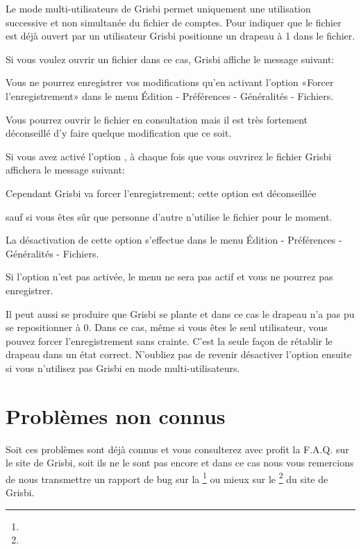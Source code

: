 Le mode multi-utilisateurs de Grisbi permet uniquement une utilisation
successive et non simultanée du fichier de comptes. Pour indiquer que le fichier
est déjà ouvert par un utilisateur Grisbi positionne un drapeau à 1 dans
le fichier.

Si vous voulez ouvrir un fichier dans ce cas, Grisbi affiche le message suivant: 

\begin{center}

Vous ne pourrez enregistrer vos modifications qu'en activant l'option «Forcer
l'enregistrement» dans le menu Édition - Préférences - Généralités - Fichiers.
\end{center}

Vous pourrez ouvrir le fichier en consultation mais il est très fortement
déconseillé d'y faire quelque modification que ce soit.

Si vous avez activé l'option , à chaque fois que
vous ouvrirez le fichier Grisbi affichera le message suivant: 

\begin{center}

Cependant Grisbi va forcer l'enregistrement; cette option est déconseillée

sauf si vous êtes sûr que personne d'autre n'utilise le fichier pour le
moment.

La désactivation de cette option s'effectue dans le menu Édition - Préférences - Généralités - Fichiers.
\end{center}

Si l'option n'est pas activée, le menu  ne sera pas
actif et vous ne pourrez pas enregistrer.

Il peut aussi se produire que Grisbi se plante et dans ce cas le drapeau n'a pas
pu se repositionner à 0. Dans ce cas, m\^eme si vous \^etes le seul utilisateur,
vous pouvez forcer l'enregistrement sans crainte. C'est la seule façon de
rétablir le drapeau dans un état correct. N'oubliez pas de revenir désactiver
l'option ensuite si vous n'utilisez pas Grisbi en mode multi-utilisateurs.

\section{Problèmes non connus}

Soit ces problèmes sont déjà connus et vous consulterez avec profit la F.A.Q.
sur le site de Grisbi, soit ils ne le sont pas encore et dans ce cas nous vous
remercions de nous transmettre un rapport de bug sur la \footnote{\urlListDevelEmail{}} ou mieux sur le \footnote{\urlBugTracker{}} du site de Grisbi.